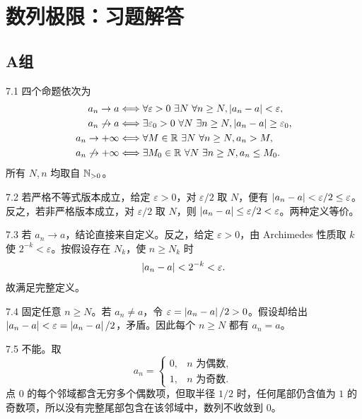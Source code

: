 \chapter{数列极限：习题解答}

\section*{A组}

\begin{solution}{7.1}
四个命题依次为
\[
\begin{aligned}
a_n\to a
&\Longleftrightarrow
\forall\varepsilon>0\ \exists N\ \forall n\ge N,
 \left|a_n-a\right|<\varepsilon,\\
a_n\not\to a
&\Longleftrightarrow
\exists\varepsilon_0>0\ \forall N\ \exists n\ge N,
 \left|a_n-a\right|\ge\varepsilon_0,\\
a_n\to+\infty
&\Longleftrightarrow
\forall M\in\mathbb{R}\ \exists N\ \forall n\ge N,
 a_n>M,\\
a_n\not\to+\infty
&\Longleftrightarrow
\exists M_0\in\mathbb{R}\ \forall N\ \exists n\ge N,
 a_n\le M_0.
\end{aligned}
\]
所有 \(N,n\) 均取自 \(\mathbb{N}_{>0}\)。
\end{solution}

\begin{solution}{7.2}
若严格不等式版本成立，给定 \(\varepsilon>0\)，对 \(\varepsilon/2\) 取 \(N\)，便有
\(\left|a_n-a\right|<\varepsilon/2\le\varepsilon\)。反之，若非严格版本成立，对 \(\varepsilon/2\) 取 \(N\)，则
\(\left|a_n-a\right|\le\varepsilon/2<\varepsilon\)。两种定义等价。
\end{solution}

\begin{solution}{7.3}
若 \(a_n\to a\)，结论直接来自定义。反之，给定 \(\varepsilon>0\)，由 Archimedes 性质取 \(k\) 使 \(2^{-k}<\varepsilon\)。按假设存在 \(N_k\)，使 \(n\ge N_k\) 时
\[
 \left|a_n-a\right|<2^{-k}<\varepsilon.
\]
故满足完整定义。
\end{solution}

\begin{solution}{7.4}
固定任意 \(n\ge N\)。若 \(a_n\ne a\)，令
\(\varepsilon=\left|a_n-a\right|/2>0\)。假设却给出
\(\left|a_n-a\right|<\varepsilon=\left|a_n-a\right|/2\)，矛盾。因此每个 \(n\ge N\) 都有 \(a_n=a\)。
\end{solution}

\begin{solution}{7.5}
不能。取
\[
 a_n=\begin{cases}0,&n\text{ 为偶数},\\1,&n\text{ 为奇数}.
 \end{cases}
\]
点 \(0\) 的每个邻域都含无穷多个偶数项，但取半径 \(1/2\) 时，任何尾部仍含值为 \(1\) 的奇数项，所以没有完整尾部包含在该邻域中，数列不收敛到 \(0\)。
\end{solution}

